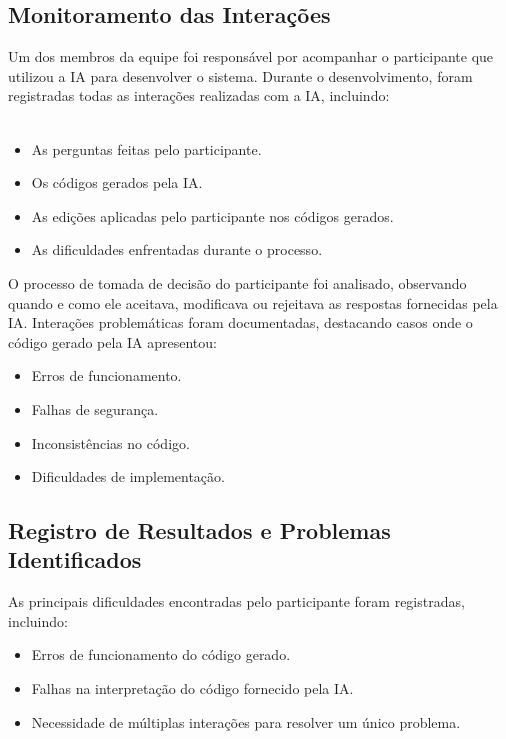 \documentclass[12pt]{article}
\begin{document}
\subsection{Monitoramento das Interações}

Um dos membros da equipe foi responsável por acompanhar o participante que utilizou a IA para desenvolver o sistema. Durante o desenvolvimento, foram registradas todas as interações realizadas com a IA, incluindo:
\\
\\

\begin{itemize}
    \item As perguntas feitas pelo participante.
    \item Os códigos gerados pela IA.
    \item As edições aplicadas pelo participante nos códigos gerados.
    \item As dificuldades enfrentadas durante o processo.
\end{itemize}

O processo de tomada de decisão do participante foi analisado, observando quando e como ele aceitava, modificava ou rejeitava as respostas fornecidas pela IA. Interações problemáticas foram documentadas, destacando casos onde o código gerado pela IA apresentou:

\begin{itemize}
    \item Erros de funcionamento.
    \item Falhas de segurança.
    \item Inconsistências no código.
    \item Dificuldades de implementação.
\end{itemize}

\subsection{Registro de Resultados e Problemas Identificados}

As principais dificuldades encontradas pelo participante foram registradas, incluindo:

\begin{itemize}
    \item Erros de funcionamento do código gerado.
    \item Falhas na interpretação do código fornecido pela IA.
    \item Necessidade de múltiplas interações para resolver um único problema.
\end{itemize}
\end{document}
